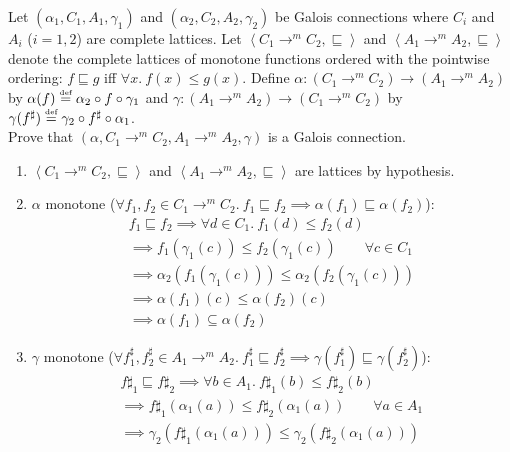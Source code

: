 \begin{exercise}{
    Let $(\alpha_1, C_1, A_1, \gamma_1)$ and $(\alpha_2, C_2, A_2, \gamma_2)$ be Galois connections where $C_i$ and $A_i$ ($i = 1,2$) are complete lattices. Let $\left<C_1 \to^m C_2, \sqsubseteq\right>$ and $\left<A_1 \to^m A_2, \sqsubseteq\right>$ denote the complete lattices of monotone functions ordered with the pointwise ordering: $f \sqsubseteq g$ iff $\forall x.\ f(x) \leq g(x)$. Define $\alpha : (C_1 \to^m C_2) \to (A_1 \to^m A_2)$ by $\alpha(f) \overset{\text{\tiny def}}{=} \alpha_2 \circ f \circ \gamma_1$ and $\gamma: (A_1 \to^m A_2) \to (C_1 \to^m C_2)$ by $\gamma(f^\sharp) \overset{\text{\tiny def}}{=} \gamma_2 \circ f^\sharp \circ \alpha_1$. \\
    Prove that $(\alpha, C_1 \to^m C_2, A_1 \to^m A_2, \gamma)$ is a Galois connection.
}
    \begin{enumerate}[1.]
        \item $\left<C_1 \to^m C_2, \sqsubseteq\right>$ and $\left<A_1 \to^m A_2, \sqsubseteq\right>$ are lattices by hypothesis.
        \item $\alpha$ monotone ($\forall f_1, f_2 \in C_1 \to^m C_2.\ f_1 \sqsubseteq f_2 \implies \alpha(f_1) \sqsubseteq \alpha(f_2)$):
        \begin{gather*}
            f_1 \sqsubseteq f_2 \implies \forall d \in C_1.\ f_1 (d) \leq f_2 (d) \\
            \implies f_1 (\gamma_1 (c)) \leq f_2 (\gamma_1 (c)) \qquad \forall c \in C_1 \\
            \implies \alpha_2 (f_1 (\gamma_1 (c))) \leq \alpha_2 (f_2 (\gamma_1 (c))) \\
            \implies \alpha(f_1)(c) \leq \alpha(f_2)(c) \\
            \implies \alpha(f_1) \subseteq \alpha(f_2)
        \end{gather*}
        \item $\gamma$ monotone ($\forall f^\sharp_1, f^\sharp_2 \in A_1 \to^m A_2.\ f^\sharp_1 \sqsubseteq f^\sharp_2 \implies \gamma(f^\sharp_1) \sqsubseteq \gamma(f^\sharp_2)$):
        \begin{gather*}
            f\sharp_1 \sqsubseteq f\sharp_2 \implies \forall b \in A_1.\ f\sharp_1 (b) \leq f\sharp_2 (b) \\
            \implies f\sharp_1 (\alpha_1 (a)) \leq f\sharp_2 (\alpha_1 (a)) \qquad \forall a \in A_1  \\
            \implies \gamma_2 (f\sharp_1 (\alpha_1 (a))) \leq \gamma_2 (f\sharp_2 (\alpha_1 (a))) \\

\end{gather*}
\end{enumerate}
\end{exercise}
